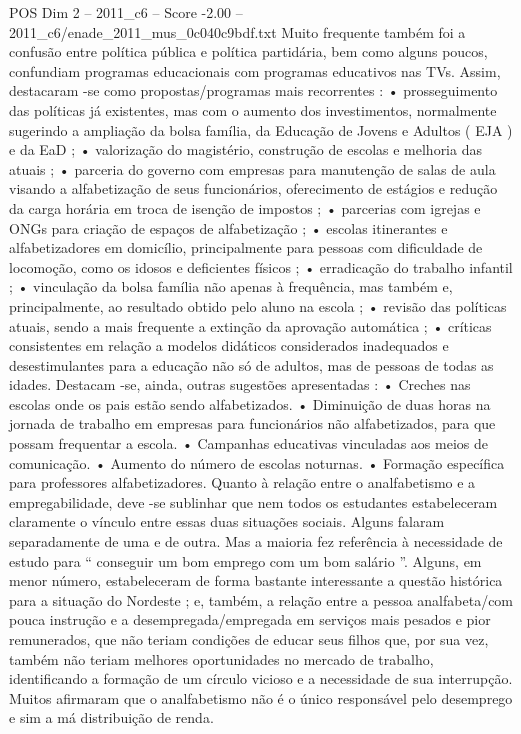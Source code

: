 \begin{textsample}{POS Dim 2 – 2011\_c6 – Score -2.00 – 2011\_c6/enade\_2011\_mus\_0c040c9bdf.txt}
Muito frequente também foi a confusão entre política pública e política partidária, bem como alguns poucos, confundiam programas educacionais com programas educativos nas TVs.
Assim, destacaram -se como propostas/programas mais recorrentes : • prosseguimento das políticas já existentes, mas com o aumento dos investimentos, normalmente sugerindo a ampliação da bolsa família, da Educação de Jovens e Adultos ( EJA ) e da EaD ; • valorização do magistério, construção de escolas e melhoria das atuais ; • parceria do governo com empresas para manutenção de salas de aula visando a alfabetização de seus funcionários, oferecimento de estágios e redução da carga horária em troca de isenção de impostos ; • parcerias com igrejas e ONGs para criação de espaços de alfabetização ; • escolas itinerantes e alfabetizadores em domicílio, principalmente para pessoas com dificuldade de locomoção, como os idosos e deficientes físicos ; • erradicação do trabalho infantil ; • vinculação da bolsa família não apenas à frequência, mas também e, principalmente, ao resultado obtido pelo aluno na escola ; • revisão das políticas atuais, sendo a mais frequente a extinção da aprovação automática ; • críticas consistentes em relação a modelos didáticos considerados inadequados e desestimulantes para a educação não só de adultos, mas de pessoas de todas as idades.
Destacam -se, ainda, outras sugestões apresentadas : • Creches nas escolas onde os pais estão sendo alfabetizados. • Diminuição de duas horas na jornada de trabalho em empresas para funcionários não alfabetizados, para que possam frequentar a escola. • Campanhas educativas vinculadas aos meios de comunicação. • Aumento do número de escolas noturnas. • Formação específica para professores alfabetizadores.
Quanto à relação entre o analfabetismo e a empregabilidade, deve -se sublinhar que nem todos os estudantes estabeleceram claramente o vínculo entre essas duas situações sociais.
Alguns falaram separadamente de uma e de outra.
Mas a maioria fez referência à necessidade de estudo para “ conseguir um bom emprego com um bom salário ”.
Alguns, em menor número, estabeleceram de forma bastante interessante a questão histórica para a situação do Nordeste ; e, também, a relação entre a pessoa analfabeta/com pouca instrução e a desempregada/empregada em serviços mais pesados e pior remunerados, que não teriam condições de educar seus filhos que, por sua vez, também não teriam melhores oportunidades no mercado de trabalho, identificando a formação de um círculo vicioso e a necessidade de sua interrupção.
Muitos afirmaram que o analfabetismo não é o único responsável pelo desemprego e sim a má distribuição de renda.

\end{textsample}
